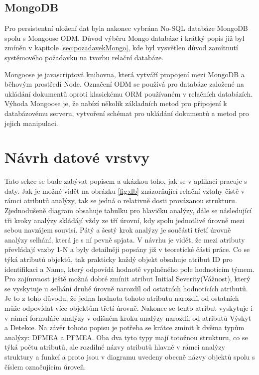 \subsection{MongoDB}
Pro persistentní uložení dat byla nakonec vybrána No-SQL databáze MongoDB spolu s Mongoose ODM. Důvod výběru Mongo databáze i krátký popis již byl zmíněn v kapitole \ref{sec:pozadavekMongo}, kde byl vysvětlen důvod zamítnutí systémového požadavku na tvorbu relační databáze. 

Mongoose je javascriptová knihovna, která vytváří propojení mezi MongoDB a běhovým prostředí Node. Označení ODM se používá pro databáze založené na ukládání dokumentů oproti klasickému ORM používaném v relačních databázích. Výhoda Mongoose je, že nabízí několik základních metod pro připojení k databázovému serveru, vytvoření schémat pro ukládání dokumentů a metod pro jejich manipulaci. 

\section{Návrh datové vrstvy}
Tato sekce se bude zabývat popisem a ukázkou toho, jak se v aplikaci pracuje s daty. Jak je možné vidět na obrázku \ref{fig:db} znázorňující relační vztahy čistě v rámci atributů analýzy, tak se jedná o relativně dosti provázanou strukturu. Zjednodušeně diagram obsahuje tabulku pro hlavičku analýzy, dále se následující tři kroky analýzy skládájí vždy ze tří úrovní, kdy spolu jednotlivé úrovně mezi sebou navzájem souvisí. Pátý a šestý krok analýzy je součástí třetí úrovně analýzy selhání, která je s ní pevně spjata. V návrhu je vidět, že mezi atributy převládají vazby 1-N a byly detailněji popsány již v teoretické části práce. Co se týká atributů objektů, tak prakticky každý objekt obsahuje atribut ID pro identifikaci a Name, který odpovídá hodnotě vyplněného pole hodnotícím týmem. Pro zajímvaost ještě možná dobré zmínit atribut Initial Severity(Vážnost), který se vyskytuje u selhání druhé úrovně narozdíl od ostatních hodnotících atributů. Je to z toho důvodu, že jedna hodnota tohoto atributu narozdíl od ostatních může odpovídat více objektům třetí úrovně. Nakonec se tento atribut vyskytuje i v rámci formuláře analýzy v odišném kroku analýzy narozdíl od atributů Výskyt a Detekce. Na závěr tohoto popisu je potřeba se krátce zmínit k dvěma typům analýzy: DFMEA a PFMEA. Oba dva tyto typy mají totožnou strukturu, co se týká počtu atributů, ale rozdílné názvy atributů hlavně v rámci analýzy struktury a funkcí a proto jsou v diagramu uvedeny obecně názvy objektů spolu s číslem označujícím úroveň. 

